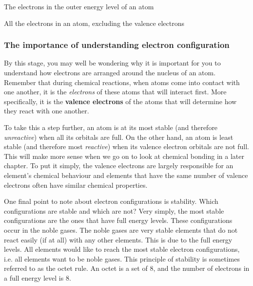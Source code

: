  { \label{m38741*meaningfhsst!!!underscore!!!id755}
        \label{m38741*id259971}The electrons in the outer energy level of an atom} 

 { \label{m38741*meaningfhsst!!!underscore!!!id758}
        \label{m38741*id259989}All the electrons in an atom, excluding the valence electrons} 
      
\label{m38741*uid105}
            \subsubsection{ The importance of understanding electron configuration}
            \nopagebreak
        \label{m38741*id260011}By this stage, you may well be wondering why it is important for you to understand how electrons are arranged around the nucleus of an atom. Remember that during chemical reactions, when atoms come into contact with one another, it is the \textsl{electrons} of these atoms that will interact first. More specifically, it is the \textbf{valence electrons} of the atoms that will determine how they react with one another.\par 
        \label{m38741*id260029}To take this a step further, an atom is at its most stable (and therefore \textsl{unreactive}) when all its orbitals are full. On the other hand, an atom is least stable (and therefore most \textsl{reactive}) when its valence electron orbitals are not full. This will make more sense when we go on to look at chemical bonding in a later chapter. To put it simply, the valence electrons are largely responsible for an element's chemical behaviour and elements that have the same number of valence electrons often have similar chemical properties.\par 
\label{m38741*eip-106}One final point to note about electron configurations is stability. Which configurations are stable and which are not? Very simply, the most stable configurations are the ones that have full energy levels. These configurations occur in the noble gases. The noble gases are very stable elements that do not react easily (if at all) with any other elements. This is due to the full energy levels. All elements would like to reach the most stable electron configurations, i.e. all elements want to be noble gases. This principle of stability is sometimes referred to as the octet rule. An octet is a set of 8, and the number of electrons in a full energy level is 8. \par \label{m38741*eip-739}


